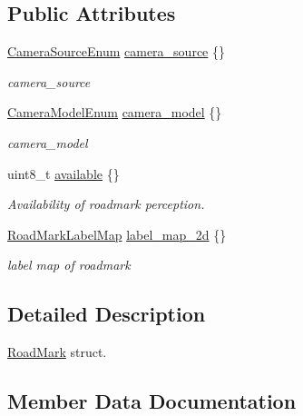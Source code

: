 \subsection*{Public Attributes}
\begin{DoxyCompactItemize}
\item 
\hyperlink{structmaf__perception__interface_1_1CameraSourceEnum}{Camera\+Source\+Enum} \hyperlink{structmaf__perception__interface_1_1RoadMark_a2424987294ba530d23d7c617616567ff}{camera\+\_\+source} \{\}
\begin{DoxyCompactList}\small\item\em camera\+\_\+source \end{DoxyCompactList}\item 
\hyperlink{structmaf__perception__interface_1_1CameraModelEnum}{Camera\+Model\+Enum} \hyperlink{structmaf__perception__interface_1_1RoadMark_a8758612a2633408b0e2135b316a3ccdc}{camera\+\_\+model} \{\}
\begin{DoxyCompactList}\small\item\em camera\+\_\+model \end{DoxyCompactList}\item 
uint8\+\_\+t \hyperlink{structmaf__perception__interface_1_1RoadMark_a3bbded687ccdf688f53fb17de581f882}{available} \{\}
\begin{DoxyCompactList}\small\item\em Availability of roadmark perception. \end{DoxyCompactList}\item 
\hyperlink{structmaf__perception__interface_1_1RoadMarkLabelMap}{Road\+Mark\+Label\+Map} \hyperlink{structmaf__perception__interface_1_1RoadMark_a7fa525419c3c12d12c9e9b6b3585ea7a}{label\+\_\+map\+\_\+2d} \{\}
\begin{DoxyCompactList}\small\item\em label map of roadmark \end{DoxyCompactList}\end{DoxyCompactItemize}


\subsection{Detailed Description}
\hyperlink{structmaf__perception__interface_1_1RoadMark}{Road\+Mark} struct. 

\subsection{Member Data Documentation}
\mbox{\label{structmaf__perception__interface_1_1RoadMark_a3bbded687ccdf688f53fb17de581f882}} 
